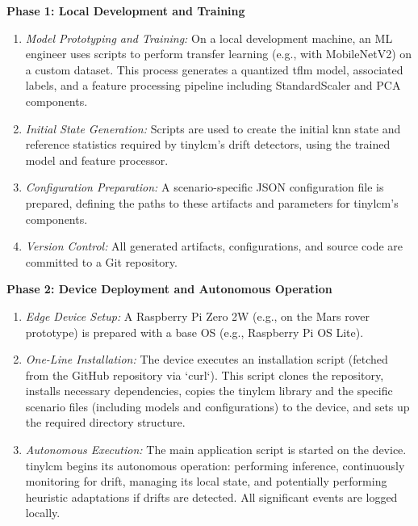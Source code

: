 \textbf{Phase 1: Local Development and Training}
\begin{enumerate}[noitemsep, topsep=0pt]
    \item \textit{Model Prototyping and Training:} On a local development machine, an ML engineer uses scripts to perform transfer learning (e.g., with MobileNetV2) on a custom dataset. This process generates a quantized \gls{tflm} model, associated labels, and a feature processing pipeline including StandardScaler and PCA components.
    \item \textit{Initial State Generation:} Scripts are used to create the initial \gls{knn} state and reference statistics required by \gls{tinylcm}'s drift detectors, using the trained model and feature processor.
    \item \textit{Configuration Preparation:} A scenario-specific JSON configuration file is prepared, defining the paths to these artifacts and parameters for \gls{tinylcm}'s components.
    \item \textit{Version Control:} All generated artifacts, configurations, and source code are committed to a Git repository.
\end{enumerate}

\textbf{Phase 2: Device Deployment and Autonomous Operation}
\begin{enumerate}[noitemsep, topsep=0pt]
    \item \textit{Edge Device Setup:} A Raspberry Pi Zero 2W (e.g., on the Mars rover prototype) is prepared with a base OS (e.g., Raspberry Pi OS Lite).
    \item \textit{One-Line Installation:} The device executes an installation script (fetched from the GitHub repository via `curl`). This script clones the repository, installs necessary dependencies, copies the \gls{tinylcm} library and the specific scenario files (including models and configurations) to the device, and sets up the required directory structure.
    \item \textit{Autonomous Execution:} The main application script is started on the device. \gls{tinylcm} begins its autonomous operation: performing inference, continuously monitoring for drift, managing its local state, and potentially performing heuristic adaptations if drifts are detected. All significant events are logged locally.
\end{enumerate}

